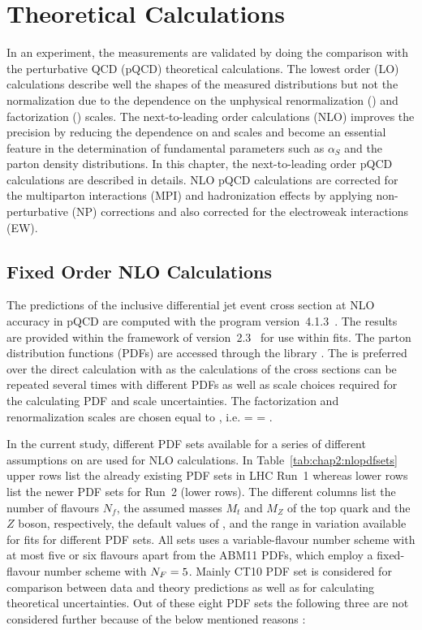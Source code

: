 \chapter{Theoretical Calculations}
\label{chap:Theory_Predictions}

In an experiment, the measurements are validated by doing the comparison with the perturbative QCD (pQCD) theoretical calculations. The lowest order (LO) calculations describe well the shapes of the measured distributions but not the normalization due to the dependence on the unphysical renormalization (\mur) and factorization (\muf) scales. The next-to-leading order calculations (NLO) improves the precision by reducing the dependence on \mur and \muf scales and become an essential feature in the determination of fundamental parameters such as $\alpha_S$ and the parton density distributions. In this chapter, the next-to-leading order pQCD calculations are described in details. NLO pQCD calculations are corrected for the multiparton interactions (MPI) and hadronization effects by applying non-perturbative (NP) corrections and also corrected for the electroweak interactions (EW).

\section{Fixed Order NLO Calculations}
The predictions of the inclusive differential jet event cross section at NLO accuracy in pQCD are computed with the \NLOJETPP program version~4.1.3~\cite{Nagy:2001fj,Nagy:2003tz}. The results are provided within the framework of \fastNLO version~2.3~\cite{Kluge:2006xs,Britzger:2012bs} for use within fits. The parton distribution functions (PDFs) are accessed through the \LHAPDFS library \cite{Whalley:2005nh,Buckley:2014ana}. The \fastNLO is preferred over the direct calculation with \NLOJETPP as the calculations of the cross sections can be repeated several times with different PDFs as well as scale choices required for the calculating PDF and scale uncertainties. The factorization and renormalization scales are chosen equal to \httwo, i.e. \muf = \mur = \httwo. 

In the current study, different PDF sets available for a series of different assumptions on \alpsmz are used for NLO calculations. In Table~\ref{tab:chap2:nlopdfsets} upper rows list the already existing PDF sets in LHC Run~1 whereas lower rows list the newer PDF sets for Run~2 (lower rows). The different columns list the number of flavours $N_f$, the assumed masses $M_t$ and $M_Z$ of the top quark and the $Z$ boson, respectively, the default values of \alpsmz, and the range in \alpsmz variation available for fits for different PDF sets. All sets uses a variable-flavour number scheme with at most five or six flavours apart from the ABM11 PDFs, which employ a fixed-flavour number scheme with $N_F=5$. Mainly CT10 PDF set is considered for comparison between data and theory predictions as well as for calculating theoretical uncertainties. Out of these eight PDF sets the following three are not considered further because of the below mentioned reasons :

